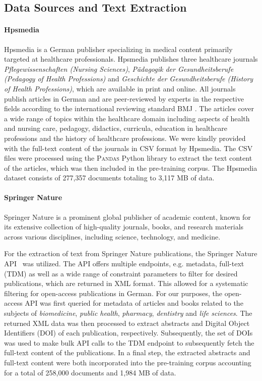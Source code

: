 \subsection{Data Sources and Text Extraction}

\paragraph{Hpsmedia}
Hpsmedia is a German publisher specializing in medical content primarily
targeted at healthcare professionals. Hpsmedia publishes three healthcare
journals \textit{Pflegewissenschaften (Nursing Sciences)}, \textit{Pädagogik der
Gesundheitsberufe (Pedagogy of Health Professions)} and \textit{Geschichte der
Gesundheitsberufe (History of Health Professions)}, which are available in print
and online. All journals publish articles in German and are peer-reviewed by
experts in the respective fields according to the international reviewing
standard BMJ \cite{smith2006peer}. The articles cover a wide range of topics
within the healthcare domain including aspects of health and nursing care,
pedagogy, didactics, curricula, education in healthcare professions and the
history of healthcare professions. We were kindly provided with the full-text
content of the journals in CSV format by Hpsmedia. The CSV files were processed
using the \textsc{Pandas} \cite{mckinney2010data} Python library to extract the
text content of the articles, which was then included in the pre-training
corpus. The Hpsmedia dataset consists of 277,357 documents totaling to 3,117 MB
of data.

\paragraph{Springer Nature}
Springer Nature is a prominent global publisher of academic content, known for
its extensive collection of high-quality journals, books, and research materials
across various disciplines, including science, technology, and medicine.

For the extraction of text from Springer Nature publications, the Springer
Nature API~\cite{springernature} was utilized. The API offers multiple
endpoints, e.g. metadata, full-text (TDM) as well as a wide range of constraint
parameters to filter for desired publications, which are returned in XML format.
This allowed for a systematic filtering for open-access publications in German.
For our purposes, the open-access API was first queried for metadata of articles
and books related to the subjects of \textit{biomedicine}, \textit{public
health}, \textit{pharmacy}, \textit{dentistry} and \textit{life sciences}. The
returned XML data was then processed to extract abstracts and Digital Object
Identifiers (DOI) of each publication, respectively. Subsequently, the set of
DOIs was used to make bulk API calls to the TDM endpoint to subsequently fetch
the full-text content of the publications. In a final step, the extracted
abstracts and full-text content were both incorporated into the pre-training
corpus accounting for a total of 258,000 documents and 1,984 MB of data.

